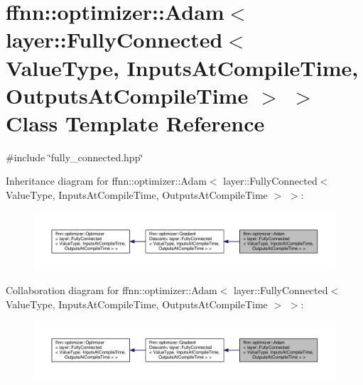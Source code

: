 \hypertarget{classffnn_1_1optimizer_1_1_adam_3_01layer_1_1_fully_connected_3_01_value_type_00_01_inputs_at_co08ce471fd3ee7441a350cc42cfd35bcd}{\section{ffnn\-:\-:optimizer\-:\-:Adam$<$ layer\-:\-:Fully\-Connected$<$ Value\-Type, Inputs\-At\-Compile\-Time, Outputs\-At\-Compile\-Time $>$ $>$ Class Template Reference}
\label{classffnn_1_1optimizer_1_1_adam_3_01layer_1_1_fully_connected_3_01_value_type_00_01_inputs_at_co08ce471fd3ee7441a350cc42cfd35bcd}
}


{\ttfamily \#include \char`\"{}fully\-\_\-connected.\-hpp\char`\"{}}



Inheritance diagram for ffnn\-:\-:optimizer\-:\-:Adam$<$ layer\-:\-:Fully\-Connected$<$ Value\-Type, Inputs\-At\-Compile\-Time, Outputs\-At\-Compile\-Time $>$ $>$\-:\nopagebreak
\begin{figure}[H]
\begin{center}
\leavevmode
\includegraphics[width=350pt]{classffnn_1_1optimizer_1_1_adam_3_01layer_1_1_fully_connected_3_01_value_type_00_01_inputs_at_cobe2b9b06adffa70e04791567cce9f420}
\end{center}
\end{figure}


Collaboration diagram for ffnn\-:\-:optimizer\-:\-:Adam$<$ layer\-:\-:Fully\-Connected$<$ Value\-Type, Inputs\-At\-Compile\-Time, Outputs\-At\-Compile\-Time $>$ $>$\-:\nopagebreak
\begin{figure}[H]
\begin{center}
\leavevmode
\includegraphics[width=350pt]{classffnn_1_1optimizer_1_1_adam_3_01layer_1_1_fully_connected_3_01_value_type_00_01_inputs_at_co5b19aea91ccd4a29fa3c61e22c78efee}
\end{center}
\end{figure}

